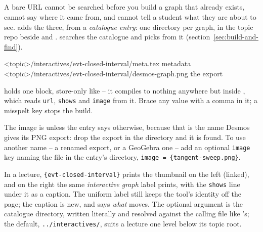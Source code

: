 \subsection*{\texorpdfstring{}{\textbackslash interactive}}

A bare URL cannot be searched before you build a graph that already
exists, cannot say where it came from, and cannot tell a student what
they are about to see.  adds the three, from a
\emph{catalogue entry}: one directory per graph, in the topic repo beside
 and .
 searches the catalogue and 
picks from it (section~\ref{sec:build-and-find}).

\begin{manexsource}
<topic>/interactives/evt-closed-interval/meta.tex          metadata
<topic>/interactives/evt-closed-interval/desmos-graph.png  the export
\end{manexsource}

 holds one block, store-only like  -- it
compiles to nothing anywhere but inside , which reads
\texttt{url}, \texttt{shows} and \texttt{image} from it. Brace any value
with a comma in it; a misspelt key stops the build.

The image is  unless the entry says otherwise,
because that is the name Desmos gives its PNG export: drop the export in
the directory and it is found. To use another name -- a renamed export,
or a GeoGebra one -- add an optional \texttt{image} key naming the file
in the entry's directory, \texttt{image = \{tangent-sweep.png\}}.

\begin{manexsource}
\end{manexsource}

In a lecture, \texttt{\{evt-closed-interval\}} prints the
thumbnail on the left (linked), and on the right the same
\emph{interactive graph} label  prints, with the \texttt{shows}
line under it as a caption. The uniform label still keeps the tool's
identity off the page; the caption is new, and says \emph{what} moves.
The optional argument is the catalogue directory, written literally and
resolved against the calling file like 's; the default,
\texttt{../interactives/}, suits a lecture one level below its topic root.

